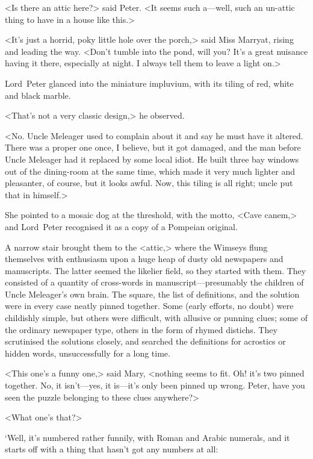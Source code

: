 <Is there an attic here?> said Peter. <It seems such a—well, such an un-attic thing to have in a house like this.>

<It's just a horrid, poky little hole over the porch,> said Miss Marryat, rising and leading the way. <Don't tumble into the pond, will you? It's a great nuisance having it there, especially at night. I always tell them to leave a light on.>

Lord~Peter glanced into the miniature impluvium, with its tiling of red, white and black marble.

<That's not a very classic design,> he observed.

<No. Uncle Meleager used to complain about it and say he must have it altered. There was a proper one once, I believe, but it got damaged, and the man before Uncle Meleager had it replaced by some local idiot. He built three bay windows out of the dining-room at the same time, which made it very much lighter and pleasanter, of course, but it looks awful. Now, this tiling is all right; uncle put that in himself.>

She pointed to a mosaic dog at the threshold, with the motto, <Cave canem,> and Lord~Peter recognised it as a copy of a Pompeian original.

A narrow stair brought them to the <attic,> where the Wimseys flung themselves with enthusiasm upon a huge heap of dusty old newspapers and manuscripts. The latter seemed the likelier field, so they started with them. They consisted of a quantity of cross-words in manuscript—presumably the children of Uncle Meleager's own brain. The square, the list of definitions, and the solution were in every case neatly pinned together. Some (early efforts, no doubt) were childishly simple, but others were difficult, with allusive or punning clues; some of the ordinary newspaper type, others in the form of rhymed distichs. They scrutinised the solutions closely, and searched the definitions for acrostics or hidden words, unsuccessfully for a long time.

<This one's a funny one,> said Mary, <nothing seems to fit. Oh! it's two pinned together. No, it isn't—yes, it is—it's only been pinned up wrong. Peter, have you seen the puzzle belonging to these clues anywhere?>

<What one's that?>

`Well, it's numbered rather funnily, with Roman and Arabic numerals, and it starts off with a thing that hasn't got any numbers at all:

